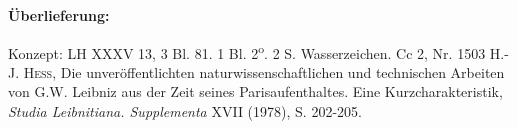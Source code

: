 %
\begin{ledgroupsized}[r]{120mm}
\footnotesize 
\pstart 
\noindent\textbf{\"{U}berlieferung:}
\pend
\end{ledgroupsized}
\begin{ledgroupsized}[r]{114mm}
\footnotesize 
\pstart \parindent -6mm
%
Konzept: LH XXXV 13, 3 Bl. 81. 1 Bl. 2\textsuperscript{o}. 2 S. Wasserzeichen.
\newline%
Cc 2, Nr. 1503
\pend%
\pstart%
\parindent -6mm
\textsc{H.-J. Hess},\cite{00188} \glqq Die unver\"{o}ffentlichten naturwissenschaftlichen und technischen Arbeiten von G.W. Leibniz aus der Zeit seines Parisaufenthaltes. Eine Kurzcharakteristik\grqq, \textit{Studia Leibnitiana. Supplementa} XVII (1978), S. 202-205.
\pend%
\end{ledgroupsized}
